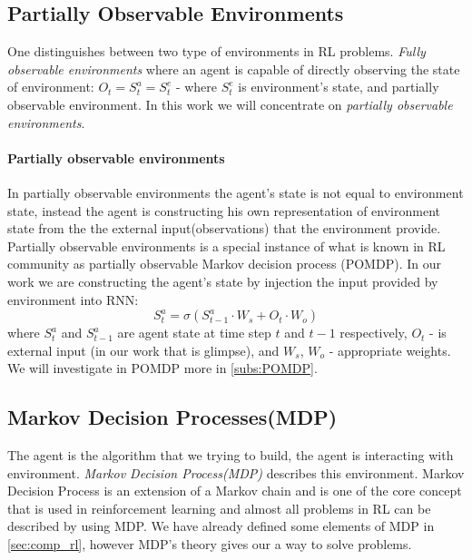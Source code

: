 \subsection{Partially Observable Environments}
One distinguishes between two type of environments in RL problems.
\emph{Fully observable environments} where an agent is capable of directly
observing the state of environment:
$O_t = S_t^a = S_t^e$ - where $S_t^e$ is environment's state,
and partially observable environment. In this work we will concentrate
on \emph{partially observable environments}.

\paragraph{Partially observable environments}
In partially observable environments the agent's state is not equal to environment state,
instead the agent is constructing his own representation of environment state from
the the external input(observations) that the environment provide.
Partially observable environments is a special instance of what is known in RL community
as partially observable Markov decision process (POMDP). In our work we are constructing
the agent's state by injection the input provided by environment into RNN:
\begin{equation} \label{eq:rnn_state}
	S_t^a = \sigma(S_{t-1}^a \cdot W_s + O_t \cdot W_o)
\end{equation}
where $S_t^a$ and $S_{t-1}^a$ are agent state at time step $t$ and $t-1$
respectively, $O_t$ - is external input (in our work that is glimpse),
and $W_s$, $W_o$ - appropriate weights.
We will investigate in POMDP more in \autoref{subs:POMDP}.



\subsection{Markov Decision Processes(MDP)} \label{subs:reward_process}
The agent is the algorithm that we trying to build, the agent is interacting with
environment. \emph{Markov Decision Process(MDP)} describes this environment.
Markov Decision Process is an extension of a Markov chain and is one of the core
concept that is used in reinforcement learning and almost all problems in RL
can be described by using MDP. We have already defined some elements of MDP in \autoref{sec:comp_rl},
however MDP's theory gives our a way to solve problems.


